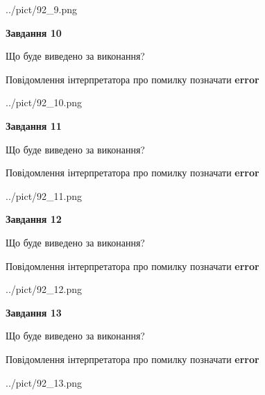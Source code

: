 \documentclass[11pt, ukrainian]{article}
\begin{document}
{\begin {large}
\begin{center}
	{../pict/92_9.png}
\end{center}
\newpage

{\begin {center}\textbf{Завдання 10}\end {center}}\par
Що буде виведено за виконання? \par
Повідомлення інтерпретатора про помилку позначати \textbf{error}

\begin{center}
	{../pict/92_10.png}
\end{center}
\newpage

{\begin {center}\textbf{Завдання 11}\end {center}}\par
Що буде виведено за виконання? \par
Повідомлення інтерпретатора про помилку позначати \textbf{error}

\begin{center}
	{../pict/92_11.png}
\end{center}
\newpage

{\begin {center}\textbf{Завдання 12}\end {center}}\par
Що буде виведено за виконання? \par
Повідомлення інтерпретатора про помилку позначати \textbf{error}

\begin{center}
	{../pict/92_12.png}
\end{center}
\newpage

{\begin {center}\textbf{Завдання 13}\end {center}}\par
Що буде виведено за виконання? \par
Повідомлення інтерпретатора про помилку позначати \textbf{error}

\begin{center}
	{../pict/92_13.png}
\end{center}
\newpage


\end{large}}
\end{document}

